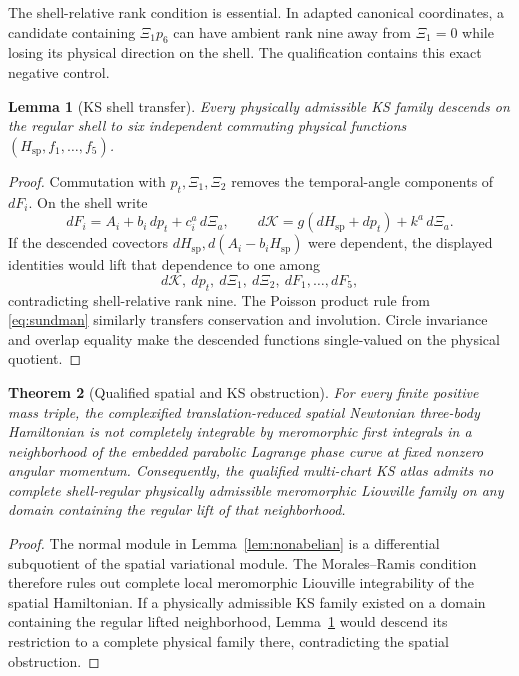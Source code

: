 \documentclass[11pt]{article}
\newtheorem{theorem}{Theorem}
\newtheorem{lemma}[theorem]{Lemma}
\theoremstyle{definition}
\theoremstyle{remark}
\newcommand{\XiMap}{\Xi}
\begin{document}
The shell-relative rank condition is essential.  In adapted canonical
coordinates, a candidate containing \(\XiMap_1p_6\) can have ambient rank
nine away from \(\XiMap_1=0\) while losing its physical direction on the
shell.  The qualification contains this exact negative control.

\begin{lemma}[KS shell transfer]
\label{lem:ks-transfer}
Every physically admissible KS family descends on the regular shell to six
independent commuting physical functions
\((H_{\mathrm{sp}},f_1,\ldots,f_5)\).
\end{lemma}

\begin{proof}
Commutation with \(p_t,\XiMap_1,\XiMap_2\) removes the temporal-angle
components of \(dF_i\).  On the shell write
\[
dF_i=A_i+b_i\,dp_t+c_i^a\,d\XiMap_a,\qquad
d\mathcal K=g(dH_{\mathrm{sp}}+dp_t)+k^a\,d\XiMap_a.
\]
If the descended covectors
\(dH_{\mathrm{sp}},d(A_i-b_iH_{\mathrm{sp}})\) were dependent, the displayed
identities would lift that dependence to one among
\[
d\mathcal K,\ dp_t,\ d\XiMap_1,\ d\XiMap_2,\ dF_1,\ldots,dF_5,
\]
contradicting shell-relative rank nine.  The Poisson product rule from
\eqref{eq:sundman} similarly transfers conservation and involution.  Circle
invariance and overlap equality make the descended functions single-valued
on the physical quotient.
\end{proof}

\begin{theorem}[Qualified spatial and KS obstruction]
\label{thm:main}
For every finite positive mass triple, the complexified
translation-reduced spatial Newtonian three-body Hamiltonian is not
completely integrable by meromorphic first integrals in a neighborhood of
the embedded parabolic Lagrange phase curve at fixed nonzero angular
momentum.
Consequently, the qualified multi-chart KS atlas admits no complete
shell-regular physically admissible meromorphic Liouville family on any
domain containing the regular lift of that neighborhood.
\end{theorem}

\begin{proof}
The normal module in Lemma~\ref{lem:nonabelian} is a differential subquotient
of the spatial variational module.  The Morales--Ramis condition therefore
rules out complete local meromorphic Liouville integrability of the spatial
Hamiltonian.  If a physically admissible KS family existed on a domain
containing the regular lifted neighborhood, Lemma~\ref{lem:ks-transfer}
would descend its restriction to a complete physical family there,
contradicting the spatial obstruction.
\end{proof}
\end{document}
